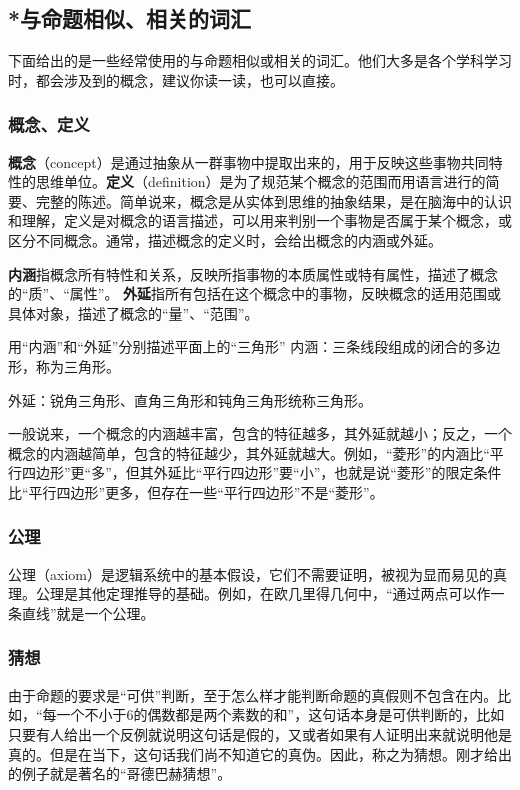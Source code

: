 \subsection{*与命题相似、相关的词汇}

下面给出的是一些经常使用的与命题相似或相关的词汇。他们大多是各个学科学习时，都会涉及到的概念，建议你读一读，也可以直接。

\subsubsection{概念、定义}

\textbf{概念}（concept）是通过抽象从一群事物中提取出来的，用于反映这些事物共同特性的思维单位。\textbf{定义}（definition）是为了规范某个概念的范围而用语言进行的简要、完整的陈述。简单说来，概念是从实体到思维的抽象结果，是在脑海中的认识和理解，定义是对概念的语言描述，可以用来判别一个事物是否属于某个概念，或区分不同概念。通常，描述概念的定义时，会给出概念的内涵或外延。

\textbf{内涵}指概念所有特性和关系，反映所指事物的本质属性或特有属性，描述了概念的“质”、“属性”。
\textbf{外延}指所有包括在这个概念中的事物，反映概念的适用范围或具体对象，描述了概念的“量”、“范围”。
\begin{example}{用“内涵”和“外延”分别描述平面上的“三角形”}
内涵：三条线段组成的闭合的多边形，称为三角形。

外延：锐角三角形、直角三角形和钝角三角形统称三角形。
\end{example}

一般说来，一个概念的内涵越丰富，包含的特征越多，其外延就越小；反之，一个概念的内涵越简单，包含的特征越少，其外延就越大。例如，“菱形”的内涵比“平行四边形”更“多”，但其外延比“平行四边形”要“小”，也就是说“菱形”的限定条件比“平行四边形”更多，但存在一些“平行四边形”不是“菱形”。

\subsubsection{公理}

公理（axiom）是逻辑系统中的基本假设，它们不需要证明，被视为显而易见的真理。公理是其他定理推导的基础。例如，在欧几里得几何中，“通过两点可以作一条直线”就是一个公理。

\subsubsection{猜想}

由于命题的要求是“可供”判断，至于怎么样才能判断命题的真假则不包含在内。比如，“每一个不小于6的偶数都是两个素数的和”，这句话本身是可供判断的，比如只要有人给出一个反例就说明这句话是假的，又或者如果有人证明出来就说明他是真的。但是在当下，这句话我们尚不知道它的真伪。因此，称之为猜想。刚才给出的例子就是著名的“哥德巴赫猜想”。

